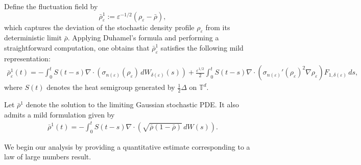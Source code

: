 \documentclass[UTF-8,reqno]{amsart}
\numberwithin{equation}{section}
\begin{document}
Define the fluctuation field by
$$
\bar{\rho}^1_{\varepsilon} := \varepsilon^{-1/2}(\rho_{\varepsilon} - \bar{\rho}),
$$
which captures the deviation of the stochastic density profile $\rho_{\varepsilon}$ from its deterministic limit $\bar{\rho}$. Applying Duhamel's formula and performing a straightforward computation, one obtains that $\bar{\rho}^1_{\varepsilon}$ satisfies the following mild representation:
\begin{align*}
\bar{\rho}^1_{\varepsilon}(t) 
= - \int_0^t S(t-s) \nabla \cdot \left( \sigma_{n(\varepsilon)}(\rho_{\varepsilon}) \, dW_{\delta(\varepsilon)}(s) \right) 
+ \frac{\varepsilon^{1/2}}{2} \int_0^t S(t-s) \nabla \cdot \left( \sigma_{n(\varepsilon)}'(\rho_{\varepsilon})^2 \nabla \rho_{\varepsilon} \right) F_{1,\delta(\varepsilon)} \, ds,
\end{align*}
where $S(t)$ denotes the heat semigroup generated by $\frac{1}{2}\Delta$ on $\mathbb{T}^d$.

Let $\bar{\rho}^1$ denote the solution to the limiting Gaussian stochastic PDE. It also admits a mild formulation given by
\begin{align*}
\bar{\rho}^1(t) = -\int_0^t S(t-s)\nabla\cdot\left(\sqrt{\bar{\rho}(1 - \bar{\rho})} \, dW(s)\right).
\end{align*}

We begin our analysis by providing a quantitative estimate corresponding to a law of large numbers result.
\end{document}
